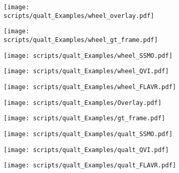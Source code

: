 \documentclass[10pt,twocolumn,letterpaper]{article}
\begin{document}
\begin{table*}[!t]
\begin{figure}[t]
    \begin{center}
    \begin{subfigure}[b]{0.09\textwidth}
        \centering
        \texttt{[image: scripts/qualt\_Examples/wheel\_overlay.pdf]}
    \end{subfigure}
    \hfill
    \begin{subfigure}[b]{0.09\textwidth}
        \centering
        \texttt{[image: scripts/qualt\_Examples/wheel\_gt\_frame.pdf]}
    \end{subfigure}
    \hfill
    \begin{subfigure}[b]{0.09\textwidth}
        \centering
        \texttt{[image: scripts/qualt\_Examples/wheel\_SSMO.pdf]}
    \end{subfigure}
    \hfill
    \begin{subfigure}[b]{0.09\textwidth}
        \centering
        \texttt{[image: scripts/qualt\_Examples/wheel\_QVI.pdf]}
    \end{subfigure}
    \hfill
    \begin{subfigure}[b]{0.09\textwidth}
        \centering
        \texttt{[image: scripts/qualt\_Examples/wheel\_FLAVR.pdf]}
    \end{subfigure}
    


    \begin{subfigure}[b]{0.09\textwidth}
        \centering
        \texttt{[image: scripts/qualt\_Examples/Overlay.pdf]}
    \end{subfigure}
    \hfill
    \begin{subfigure}[b]{0.09\textwidth}
        \centering
        \texttt{[image: scripts/qualt\_Examples/gt\_frame.pdf]}
    \end{subfigure}
    \hfill
    \begin{subfigure}[b]{0.09\textwidth}
        \centering
        \texttt{[image: scripts/qualt\_Examples/qualt\_SSMO.pdf]}
    \end{subfigure}
    \hfill
    \begin{subfigure}[b]{0.09\textwidth}
        \centering
        \texttt{[image: scripts/qualt\_Examples/qualt\_QVI.pdf]}
    \end{subfigure}
    \hfill
    \begin{subfigure}[b]{0.09\textwidth}
        \centering
        \texttt{[image: scripts/qualt\_Examples/qualt\_FLAVR.pdf]}
    \end{subfigure}
    



\end{center}
\end{figure}
\end{table*}
\end{document}
